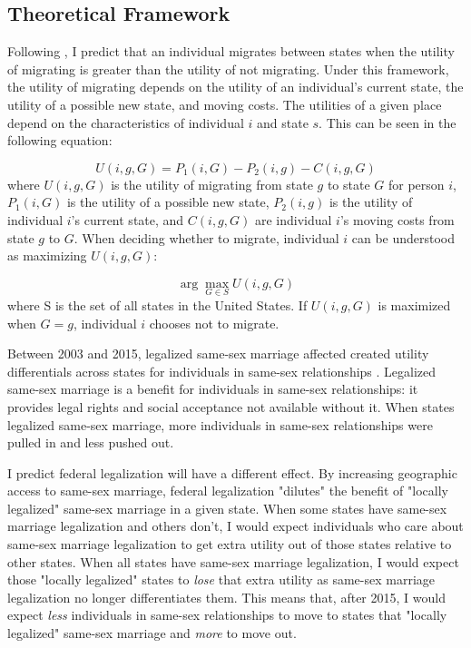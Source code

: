 \documentclass[12pt,letterpaper]{article}
\begin{document}
\subsection{Theoretical Framework}
Following \citet{1, 12, 18}, I predict that an individual migrates between states when the utility of migrating is greater than the utility of not migrating. Under this framework, the utility of migrating depends on the utility of an individual's current state, the utility of a possible new state, and moving costs. The utilities of a given place depend on the characteristics of individual $i$ and state $s$. This can be seen in the following equation: 

\begin{equation}
U(i, g, G) = P_1(i, G) - P_2(i, g) - C(i, g, G)
\end{equation}
where $U(i, g, G)$ is the utility of migrating from state $g$ to state $G$ for person $i$, $P_1(i, G)$ is the utility of a possible new state, $P_2(i, g)$ is the utility of individual $i$'s current state, and $C(i, g, G)$ are individual $i$'s moving costs from state $g$ to $G$. When deciding whether to migrate, individual $i$ can be understood as maximizing $U(i, g, G)$:

\begin{equation}
\arg\max_{G \in S} U(i, g, G)
\end{equation}
where S is the set of all states in the United States. If $U(i, g, G)$ is maximized when $G = g$, individual $i$ chooses not to migrate.

\hfill
\break
Between 2003 and 2015, legalized same-sex marriage affected created utility differentials across states for individuals in same-sex relationships \citep{1, 12}. Legalized same-sex marriage is a benefit for individuals in same-sex relationships: it provides legal rights and social acceptance not available without it. When states legalized same-sex marriage, more individuals in same-sex relationships were pulled in and less pushed out. 

I predict federal legalization will have a different effect. By increasing geographic access to same-sex marriage, federal legalization "dilutes" the benefit of "locally legalized" same-sex marriage in a given state. When some states have same-sex marriage legalization and others don't, I would expect individuals who care about same-sex marriage legalization to get extra utility out of those states relative to other states. When all states have same-sex marriage legalization, I would expect those "locally legalized" states to \textit{lose} that extra utility as same-sex marriage legalization no longer differentiates them. This means that, after 2015, I would expect \textit{less} individuals in same-sex relationships to move to states that "locally legalized" same-sex marriage and \textit{more} to move out.
\end{document}
